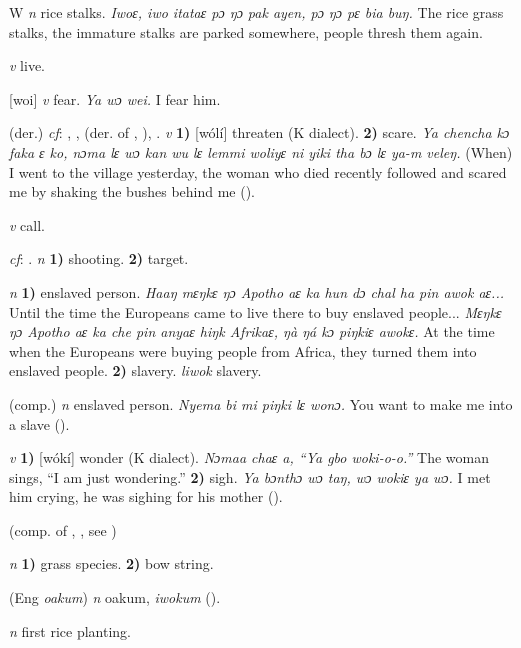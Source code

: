 \begin{letter}{W}
 \textit{n} rice stalks. \textit{Iwoɛ, iwo itataɛ pɔ ŋɔ pak ayen, pɔ ŋɔ pɛ bia buŋ.} The rice grass stalks, the immature stalks are parked somewhere, people thresh them again.

 \textit{v} live.

 [woi] \textit{v} fear. \textit{Ya wɔ wei.} I fear him.

 (der.) \textit{cf}: , ,  (der. of , ), . \textit{v} \textbf{1)} [wólí] threaten (K dialect). \textbf{2)} scare. \textit{Ya chencha kɔ faka ɛ ko, nɔma lɛ wɔ kan wu lɛ lemmi woliyɛ ni yiki tha bɔ lɛ ya-m veleŋ.} (When) I went to the village yesterday, the woman who died recently followed and scared me by shaking the bushes behind me (\citealt{Pichl1967}). 

 \textit{v} call.

 \textit{cf}: . \textit{n} \textbf{1)} shooting. \textbf{2)} target.

 \textit{n} \textbf{1)} enslaved person. \textit{Haaŋ mɛŋkɛ ŋɔ Apotho aɛ ka hun dɔ chal ha pin awok aɛ...} Until the time the Europeans came to live there to buy enslaved people... \textit{Mɛŋkɛ ŋɔ Apotho aɛ ka che pin anyaɛ hiŋk Afrikaɛ, ŋà ŋá kɔ piŋkiɛ awokɛ.} At the time when the Europeans were buying people from Africa, they turned them into enslaved people. \textbf{2)} slavery. \textit{liwok} slavery. 

 (comp.) \textit{n} enslaved person. \textit{Nyema bi mi piŋki lɛ wonɔ.} You want to make me into a slave (\citealt{Pichl1967}). 

 \textit{v} \textbf{1)} [wókí] wonder (K dialect). \textit{Nɔmaa chaɛ a, “Ya gbo woki-o-o.”} The woman sings, “I am just wondering.” \textbf{2)} sigh. \textit{Ya bɔnthɔ wɔ taŋ, wɔ wokiɛ ya wɔ.} I met him crying, he was sighing for his mother (\citealt{Pichl1967}). 

 (comp. of , , see ) 

 \textit{n} \textbf{1)} grass species. \textbf{2)} bow string.

 (Eng \textit{oakum}) \textit{n} oakum, \textit{iwokum} (\citealt{Pichl1967}). 

 \textit{n} first rice planting.


\end{letter}
